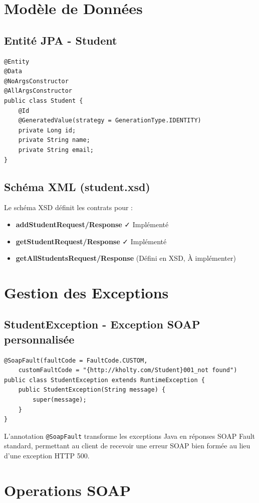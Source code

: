 \documentclass[12pt,a4paper]{report}
\begin{document}
\section{Modèle de Données}

\subsection{Entité JPA - Student}
\begin{lstlisting}
@Entity
@Data
@NoArgsConstructor
@AllArgsConstructor
public class Student {
    @Id
    @GeneratedValue(strategy = GenerationType.IDENTITY)
    private Long id;
    private String name;
    private String email;
}
\end{lstlisting}

\subsection{Schéma XML (student.xsd)}
Le schéma XSD définit les contrats pour :
\begin{itemize}
    \item \textbf{addStudentRequest/Response} ✓ Implémenté
    \item \textbf{getStudentRequest/Response} ✓ Implémenté
    \item \textbf{getAllStudentsRequest/Response} (Défini en XSD, À implémenter)
\end{itemize}

\section{Gestion des Exceptions}

\subsection{StudentException - Exception SOAP personnalisée}
\begin{lstlisting}
@SoapFault(faultCode = FaultCode.CUSTOM,
    customFaultCode = "{http://kholty.com/Student}001_not found")
public class StudentException extends RuntimeException {
    public StudentException(String message) {
        super(message);
    }
}
\end{lstlisting}

L'annotation \texttt{@SoapFault} transforme les exceptions Java en réponses SOAP Fault standard, permettant au client de recevoir une erreur SOAP bien formée au lieu d'une exception HTTP 500.

\section{Operations SOAP}
\end{document}
